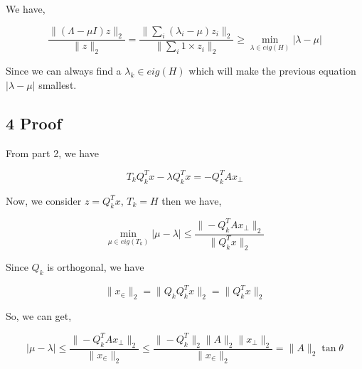 \documentclass{article}
\begin{document}
We have,

$$\frac{\| (\Lambda - \mu I) z\|_2}{\| z\|_2} = \frac{\| \sum_i (\lambda_i - \mu ) z_i\|_2}{\| \sum_i 1 \times z_i\|_2} \ge \min \limits_{\lambda \in eig (H)}  |\lambda - \mu |$$

Since we can always find a $\lambda_k \in eig (H)$ which will make the previous equation $ |\lambda - \mu |$ smallest.

\subsection*{4 Proof}

From part 2, we have

$$T_k Q_k^Tx - \lambda Q_k^T x = -Q_k^TAx_{\bot}$$

Now, we consider $z = Q_k^Tx$, $T_k = H$ then we have,

$$\min \limits_{\mu \in eig (T_k)}  |\mu - \lambda | \le \frac{\| -Q_k^TAx_{\bot}\|_2}{\|Q_k^Tx \|_2}$$

Since $Q_k$ is orthogonal, we have

$$\| x_{\in}\|_2 = \| Q_kQ^T_kx\|_2 = \| Q^T_kx\|_2  $$

So, we can get,

$$|\mu - \lambda | \le  \frac{\| -Q_k^TAx_{\bot}\|_2}{\| x_{\in}\|_2} \le \frac{\| -Q_k^T\|_2 \|A\|_2 \|x_{\bot}\|_2}{\| x_{\in}\|_2}  = \|A\|_2 \tan \theta$$
\end{document}
